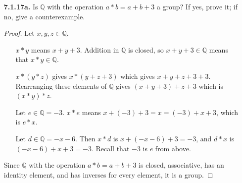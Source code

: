 \documentclass[12pt]{article}
\newcommand{\Q}{\mathbb{Q}}
\begin{document}
\begin{itemize}
		\item[\textbf{ 7.1.17a.}] Is $\Q$ with the operation $a*b=a+b+3$ a group? If yes, prove it; if no, give a counterexample.
		\begin{proof}
			Let $x, y, z \in \Q$.
			\begin{itemize}
				\item[\textbullet] $x*y$ means $x+y+3$. Addition in $\Q$ is closed, so $x+y+3 \in \Q$ means that $x*y \in \Q$.
				\item[\textbullet] $x*(y*z)$ gives $x*(y+z+3)$ which gives $x+y+z+3+3$. Rearranging these elements of $\Q$ gives $(x+y+3)+z+3$ which is $(x*y)*z$.
				\item[\textbullet] Let $e \in \Q = -3$. $x*e$ means $x+(-3)+3 = x = (-3)+x+3$, which is $e*x$.
				\item[\textbullet] Let $d \in \Q = -x-6$. Then $x*d$ is $x+(-x-6)+3 = -3$, and $d*x$ is $(-x-6)+x+3 = -3$. Recall that $-3$ is $e$ from above.
			\end{itemize}
			Since $\Q$ with the operation $a*b=a+b+3$ is closed, associative, has an identity element, and has inverses for every element, it is a group.
		\end{proof}

	\end{itemize}
\end{document}
